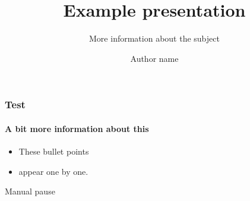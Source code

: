 \documentclass{hu-presentatie}
\begin{document}
 \title{Example presentation}
 \subtitle{More information about the subject}
 \author{Author name}

 \frame{\titlepage}

  \begin{frame}
    \frametitle{Test}
    \framesubtitle{A bit more information about this}
    \begin{itemize}[<+->]
      \item These bullet points
      \item appear one by one.
    \end{itemize}
    \pause Manual pause
  \end{frame}
\end{document}
